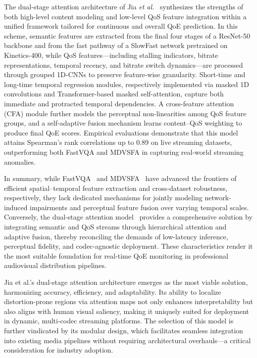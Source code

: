 The dual-stage attention architecture of Jia \textit{et al.}~\cite{jia2024continuous} synthesizes the strengths of both high-level content modeling and low-level QoS feature integration within a unified framework tailored for continuous and overall QoE prediction. In this scheme, semantic features are extracted from the final four stages of a ResNet-50 backbone and from the fast pathway of a SlowFast network pretrained on Kinetics-400, while QoS features—including stalling indicators, bitrate representations, temporal recency, and bitrate switch dynamics—are processed through grouped 1D-CNNs to preserve feature-wise granularity. Short-time and long-time temporal regression modules, respectively implemented via masked 1D convolutions and Transformer-based masked self-attention, capture both immediate and protracted temporal dependencies. A cross-feature attention (CFA) module further models the perceptual non-linearities among QoS feature groups, and a self-adaptive fusion mechanism learns content–QoS weighting to produce final QoE scores. Empirical evaluations demonstrate that this model attains Spearman's rank correlations up to 0.89 on live streaming datasets, outperforming both FastVQA and MDVSFA in capturing real-world streaming anomalies.

In summary, while FastVQA~\cite{wu2022fastvqa} and MDVSFA~\cite{li2023unified} have advanced the frontiers of efficient spatial–temporal feature extraction and cross-dataset robustness, respectively, they lack dedicated mechanisms for jointly modeling network-induced impairments and perceptual feature fusion over varying temporal scales. Conversely, the dual-stage attention model~\cite{jia2024continuous} provides a comprehensive solution by integrating semantic and QoS streams through hierarchical attention and adaptive fusion, thereby reconciling the demands of low-latency inference, perceptual fidelity, and codec-agnostic deployment. These characteristics render it the most suitable foundation for real-time QoE monitoring in professional audiovisual distribution pipelines.

Jia et al.'s dual-stage attention architecture emerges as the most viable solution, harmonizing accuracy, efficiency, and adaptability. Its ability to localize distortion-prone regions via attention maps not only enhances interpretability but also aligns with human visual saliency, making it uniquely suited for deployment in dynamic, multi-codec streaming platforms. The selection of this model is further vindicated by its modular design, which facilitates seamless integration into existing media pipelines without requiring architectural overhauls—a critical consideration for industry adoption.

